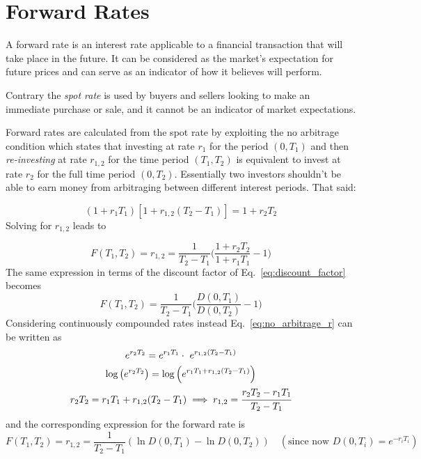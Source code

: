 \section{Forward Rates}
\label{calculating-forward-rates}
A forward rate is an interest rate applicable to a financial transaction that will take place in the future. It can be considered as the market's expectation for future prices and can serve as an indicator of how it believes will perform.

Contrary the \emph{spot rate} is used by buyers and sellers looking to make an immediate purchase or sale, and it cannot be an indicator of market expectations.

Forward rates are calculated from the spot rate by exploiting the no arbitrage condition which states that investing at rate \(r_1\) for the period \((0, T_1)\) and then \emph{re-investing} at rate \(r_{1,2}\) for the time period \((T_1, T_2)\) is equivalent to invest at rate \(r_2\) for the full time period \((0, T_2)\). Essentially two investors shouldn't be able to earn money from arbitraging between different interest periods. That said:

\begin{equation}
(1+r_1 T_1)[1+r_{1,2}(T_2 - T_1)] = 1 + r_2 T_2
\label{eq:no_arbitrage_r}
\end{equation}
Solving for \(r_{1,2}\) leads to

\begin{equation}
F(T_1, T_2) = r_{1,2} = \frac{1}{T_2 - T_1}\Big(\frac{1+r_2 T_2}{1+r_1 T_1} - 1 \Big)
\label{eq:forward_rate_simple}
\end{equation}
\vspace{1cm}
The same expression in terms of the discount factor of Eq.~\ref{eq:discount_factor} becomes
\begin{equation}
F(T_1, T_2) = \frac{1}{T_2 - T_1}\Big(\frac{D(0, T_1)}{D(0, T_2)} - 1 \Big)
\end{equation}
Considering continuously compounded rates instead Eq.~\ref{eq:no_arbitrage_r} can be written as
\begin{equation}
\begin{gathered}
e^{r_{2}T_{2}}=e^{r_{1}T_{1}}\cdot \ e^{r_{1,2} (T_{2}-T_{1})} \\
\textrm{log}\left(e^{r_{2}T_{2}}\right)=\textrm{log}\left(e^{r_{1}T_{1}+ r_{1,2} (T_{2}-T_{1})}\right) \\
r_{2}T_{2}=r_{1}T_{1}+r_{1,2}(T_{2}-T_{1})\implies r_{1,2} = \cfrac{r_2 T_2 - r_1 T_1}{T_2 - T_1} 
\end{gathered}
\end{equation}
and the corresponding expression for the forward rate is
\begin{equation}
F(T_1, T_2) = r_{1,2} = \frac {1}{T_{2}-T_{1}}(\ln D(0,T_{1})-\ln D(0,T_{2}))
\quad(\textrm{since now } D(0, T_i)=e^{-r_i T_i})
\label{eq:forward_rate_continous}
\end{equation}

